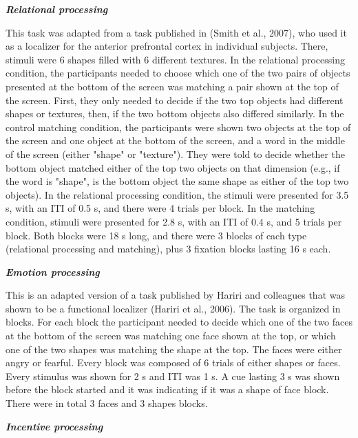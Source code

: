 \documentclass[11pt]{article}
\begin{document}
\textbf{\emph{Relational processing}}

This task was adapted from a task published in (Smith et al., 2007), who
used it as a localizer for the anterior prefrontal cortex in individual
subjects. There, stimuli were 6 shapes filled with 6 different textures.
In the relational processing condition, the participants needed to
choose which one of the two pairs of objects presented at the bottom of
the screen was matching a pair shown at the top of the screen. First,
they only needed to decide if the two top objects had different shapes
or textures, then, if the two bottom objects also differed similarly. In
the control matching condition, the participants were shown two objects
at the top of the screen and one object at the bottom of the screen, and
a word in the middle of the screen (either "shape" or "texture"). They
were told to decide whether the bottom object matched either of the top
two objects on that dimension (e.g., if the word is "shape", is the
bottom object the same shape as either of the top two objects). In the
relational processing condition, the stimuli were presented for 3.5 s,
with an ITI of 0.5 s, and there were 4 trials per block. In the matching
condition, stimuli were presented for 2.8 s, with an ITI of 0.4 s, and 5
trials per block. Both blocks were 18 s long, and there were 3 blocks of
each type (relational processing and matching), plus 3 fixation blocks
lasting 16 s each.

\textbf{\emph{Emotion processing}}

This is an adapted version of a task published by Hariri and colleagues
that was shown to be a functional localizer (Hariri et al., 2006). The
task is organized in blocks. For each block the participant needed to
decide which one of the two faces at the bottom of the screen was
matching one face shown at the top, or which one of the two shapes was
matching the shape at the top. The faces were either angry or fearful.
Every block was composed of 6 trials of either shapes or faces. Every
stimulus was shown for 2 s and ITI was 1 s. A cue lasting 3 s was shown
before the block started and it was indicating if it was a shape of face
block. There were in total 3 faces and 3 shapes blocks.

\textbf{\emph{Incentive processing}}
\end{document}
